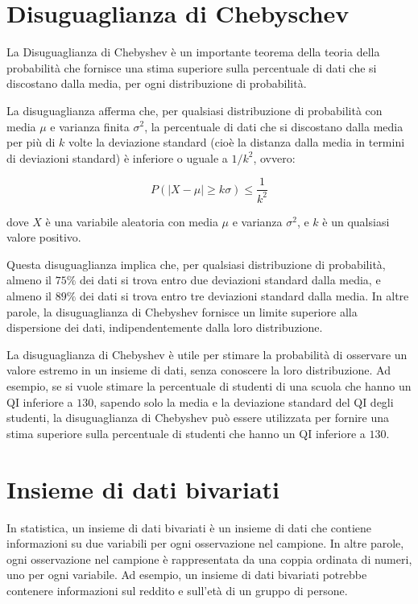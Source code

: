\section{Disuguaglianza di Chebyschev}
La Disuguaglianza di Chebyshev è un importante teorema della teoria della probabilità che fornisce una stima superiore sulla percentuale di dati che si discostano dalla media, per ogni distribuzione di probabilità.

La disuguaglianza afferma che, per qualsiasi distribuzione di probabilità con media $\mu$ e varianza finita $\sigma^2$, la percentuale di dati che si discostano dalla media per più di $k$ volte la deviazione standard (cioè la distanza dalla media in termini di deviazioni standard) è inferiore o uguale a $1/k^2$, ovvero:

$$P(|X-\mu| \geq k\sigma) \leq \frac{1}{k^2}$$

dove $X$ è una variabile aleatoria con media $\mu$ e varianza $\sigma^2$, e $k$ è un qualsiasi valore positivo.

Questa disuguaglianza implica che, per qualsiasi distribuzione di probabilità, almeno il $75\%$ dei dati si trova entro due deviazioni standard dalla media, e almeno il $89\%$ dei dati si trova entro tre deviazioni standard dalla media. In altre parole, la disuguaglianza di Chebyshev fornisce un limite superiore alla dispersione dei dati, indipendentemente dalla loro distribuzione.

La disuguaglianza di Chebyshev è utile per stimare la probabilità di osservare un valore estremo in un insieme di dati, senza conoscere la loro distribuzione. Ad esempio, se si vuole stimare la percentuale di studenti di una scuola che hanno un QI inferiore a $130$, sapendo solo la media e la deviazione standard del QI degli studenti, la disuguaglianza di Chebyshev può essere utilizzata per fornire una stima superiore sulla percentuale di studenti che hanno un QI inferiore a $130$.

\section{Insieme di dati bivariati}
In statistica, un insieme di dati bivariati è un insieme di dati che contiene informazioni su due variabili per ogni osservazione nel campione. In altre parole, ogni osservazione nel campione è rappresentata da una coppia ordinata di numeri, uno per ogni variabile. Ad esempio, un insieme di dati bivariati potrebbe contenere informazioni sul reddito e sull'età di un gruppo di persone.

